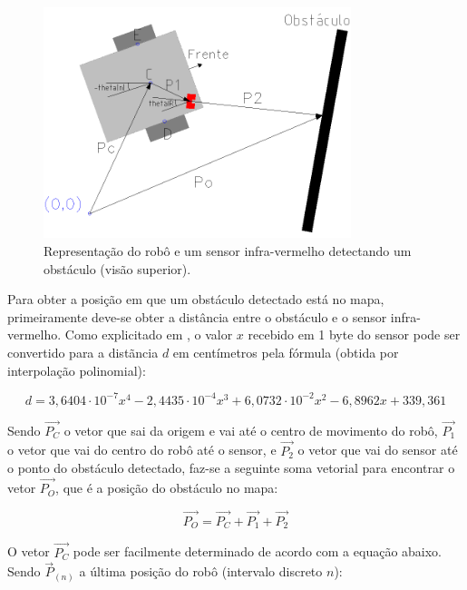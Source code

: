 \begin{figure}[H]
  \centering
  \includegraphics[width=0.8\textwidth, keepaspectratio]{./figuras/robo/robo_ir.png}
  \caption{Representação do robô e um sensor infra-vermelho detectando um obstáculo (visão superior).}
  \label{fig:robo_ir}
\end{figure}

Para obter a posição em que um obstáculo detectado está no mapa, primeiramente deve-se obter a distância entre o obstáculo e o sensor infra-vermelho. Como explicitado em \cite{bellator_2012}, o valor $x$ recebido em 1 byte do sensor pode ser convertido para a distãncia $d$ em centímetros pela fórmula (obtida por interpolação polinomial):

\begin{equation}
  d = 3,6404 \cdot 10^{-7} x^4 - 2,4435 \cdot 10^{-4} x^3 + 6,0732 \cdot 10^{-2} x^2 - 6,8962 x + 339,361
  \label{eq:IR_dist}
\end{equation}


Sendo $\overrightarrow{P_C}$ o vetor que sai da origem e vai até o centro de movimento do robô, $\overrightarrow{P_1}$ o vetor que vai do centro do robô até o sensor, e $\overrightarrow{P_2}$ o vetor que vai do sensor até o ponto do obstáculo detectado, faz-se a seguinte soma vetorial para encontrar o vetor $\overrightarrow{P_O}$, que é a posição do obstáculo no mapa:

\begin{equation}
  \overrightarrow{P_O} = \overrightarrow{P_C} + \overrightarrow{P_1} + \overrightarrow{P_2}
  \label{eq:IR_vector}
\end{equation}


O vetor $\overrightarrow{P_C}$ pode ser facilmente determinado de acordo com a equação abaixo. Sendo $\overrightarrow{P}_{(n)}$ a última posição do robô (intervalo discreto $n$):


